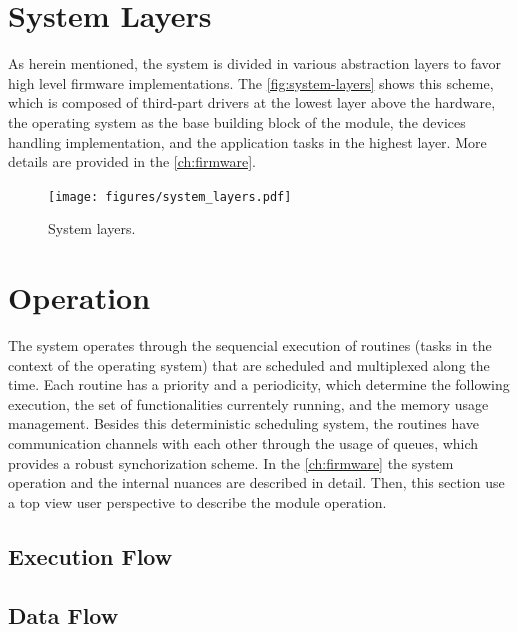 \section{System Layers}

As herein mentioned, the system is divided in various abstraction layers to favor high level firmware implementations. The \autoref{fig:system-layers} shows this scheme, which is composed of third-part drivers at the lowest layer above the hardware, the operating system as the base building block of the module, the devices handling implementation, and the application tasks in the highest layer. More details are provided in the \autoref{ch:firmware}.

\begin{figure}[!ht]
    \begin{center}
        \texttt{[image: figures/system\_layers.pdf]}
        \caption{System layers.}
        \label{fig:system-layers}
    \end{center}
\end{figure}

\section{Operation}

The system operates through the sequencial execution of routines (tasks in the context of the operating system) that are scheduled and multiplexed along the time. Each routine has a priority and a periodicity, which determine the following execution, the set of functionalities currentely running, and the memory usage management. Besides this deterministic scheduling system, the routines have communication channels with each other through the usage of queues, which provides a robust synchorization scheme. In the \autoref{ch:firmware} the system operation and the internal nuances are described in detail. Then, this section use a top view user perspective to describe the module operation.

\subsection{Execution Flow}

\subsection{Data Flow}

